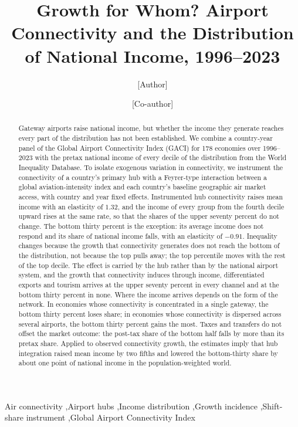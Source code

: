 \begin{frontmatter}

\title{Growth for Whom? Airport Connectivity and the Distribution of National Income, 1996--2023}

\author[a]{[Author]}
\ead{[email]}
\author[a]{[Co-author]}
\address[a]{[Affiliation]}

\begin{abstract}
Gateway airports raise national income, but whether the income they generate reaches every part of the distribution has not been established. We combine a country-year panel of the Global Airport Connectivity Index (GACI) for 178 economies over 1996--2023 with the pretax national income of every decile of the distribution from the World Inequality Database. To isolate exogenous variation in connectivity, we instrument the connectivity of a country's primary hub with a Feyrer-type interaction between a global aviation-intensity index and each country's baseline geographic air market access, with country and year fixed effects. Instrumented hub connectivity raises mean income with an elasticity of $1.32$, and the income of every group from the fourth decile upward rises at the same rate, so that the shares of the upper seventy percent do not change. The bottom thirty percent is the exception: its average income does not respond and its share of national income falls, with an elasticity of $-0.91$. Inequality changes because the growth that connectivity generates does not reach the bottom of the distribution, not because the top pulls away; the top percentile moves with the rest of the top decile. The effect is carried by the hub rather than by the national airport system, and the growth that connectivity induces through income, differentiated exports and tourism arrives at the upper seventy percent in every channel and at the bottom thirty percent in none. Where the income arrives depends on the form of the network. In economies whose connectivity is concentrated in a single gateway, the bottom thirty percent loses share; in economies whose connectivity is dispersed across several airports, the bottom thirty percent gains the most. Taxes and transfers do not offset the market outcome: the post-tax share of the bottom half falls by more than its pretax share. Applied to observed connectivity growth, the estimates imply that hub integration raised mean income by two fifths and lowered the bottom-thirty share by about one point of national income in the population-weighted world.
\end{abstract}

\begin{keyword}
Air connectivity \sep Airport hubs \sep Income distribution \sep Growth incidence \sep Shift-share instrument \sep Global Airport Connectivity Index
\end{keyword}

\end{frontmatter}

